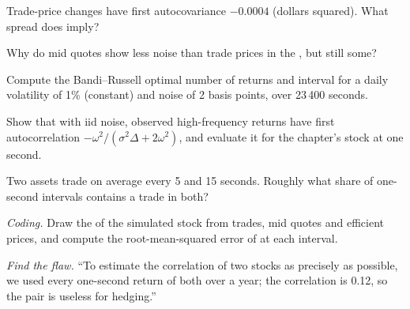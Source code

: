 \begin{exercise}[$\star$]\label{exo:qm:high-frequency-econometrics:2}
Trade-price changes have first autocovariance $-0.0004$ (dollars squared). What spread does  imply?
\end{exercise}

\begin{exercise}[$\star$]\label{exo:qm:high-frequency-econometrics:3}
Why do mid quotes show less noise than trade prices in the , but still some?
\end{exercise}

\begin{exercise}[$\star\star$]\label{exo:qm:high-frequency-econometrics:4}
Compute the Bandi--Russell optimal number of returns and interval for a daily volatility of 1\% (constant) and noise of 2 basis points, over 23\,400 seconds.
\end{exercise}

\begin{exercise}[$\star\star$]\label{exo:qm:high-frequency-econometrics:5}
Show that with iid noise, observed high-frequency returns have first autocorrelation $-\omega^2/(\sigma^2\Delta + 2\omega^2)$, and evaluate it for the chapter's stock at one second.
\end{exercise}

\begin{exercise}[$\star\star$]\label{exo:qm:high-frequency-econometrics:6}
Two assets trade on average every 5 and 15 seconds. Roughly what share of one-second intervals contains a trade in both?
\end{exercise}

\begin{exercise}[$\star\star\star$]\label{exo:qm:high-frequency-econometrics:7}
\emph{Coding.} Draw the  of the simulated stock from trades, mid quotes and efficient prices, and compute the root-mean-squared error of  at
each interval.
\end{exercise}

\begin{exercise}[$\star\star\star$]\label{exo:qm:high-frequency-econometrics:8}
\emph{Find the flaw.} ``To estimate the correlation of two stocks as precisely as possible, we used every one-second return of both over a year; the correlation is 0.12,
so the pair is useless for hedging.''
\end{exercise}


